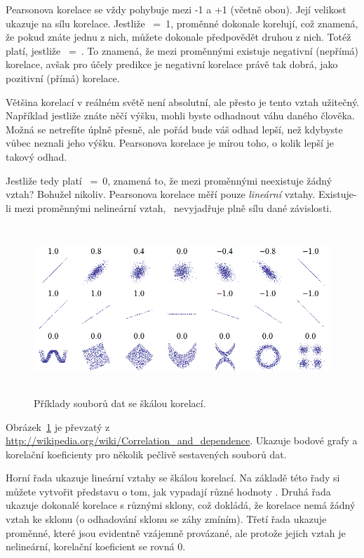 \documentclass[12pt]{book}
\begin{document}
Pearsonova korelace se vždy pohybuje mezi -1 a +1 (včetně obou).
Její velikost ukazuje na sílu korelace. Jestliže \myrho~=~1, proměnné dokonale korelují, což znamená, že pokud znáte jednu z nich, můžete dokonale předpovědět druhou z nich. Totéž platí, jestliže \myrho~=~.  To znamená, že mezi proměnnými existuje negativní (nepřímá) korelace, avšak pro účely predikce je negativní korelace právě tak dobrá, jako pozitivní (přímá) korelace.

Většina korelací v reálném světě není absolutní, ale přesto je tento vztah užitečný. Například jestliže znáte něčí výšku, mohli byste odhadnout váhu daného člověka. Možná se netrefíte úplně přesně, ale pořád bude váš odhad lepší, než kdybyste vůbec neznali jeho výšku. Pearsonova korelace je mírou toho, o kolik lepší je takový odhad.

Jestliže tedy platí \myrho~=~0, znamená to, že mezi proměnnými neexistuje žádný vztah? Bohužel nikoliv. Pearsonova korelace měří pouze {\em lineární} vztahy. Existuje-li mezi proměnnými nelineární vztah, \myrho~nevyjadřuje plně sílu dané závislosti.

\begin{figure}
\centerline{\includegraphics[height=2.5in]{figs/Correlation_examples.png}}
\caption{Příklady souborů dat se škálou korelací.}
\label{corr_examples}
\end{figure}

Obrázek~\ref{corr_examples} je převzatý z
\url{http://wikipedia.org/wiki/Correlation_and_dependence}.  Ukazuje bodové grafy a korelační koeficienty pro několik pečlivě sestavených souborů dat.

Horní řada ukazuje lineární vztahy se škálou korelací. Na základě této řady si můžete vytvořit představu o tom, jak vypadají různé hodnoty \myrho. Druhá řada ukazuje dokonalé korelace s různými sklony, což dokládá, že korelace nemá žádný vztah ke sklonu (o odhadování sklonu se záhy zmíním). Třetí řada ukazuje proměnné, které jsou evidentně vzájemně provázané, ale protože jejich vztah je nelineární, korelační koeficient se rovná 0.
\end{document}
